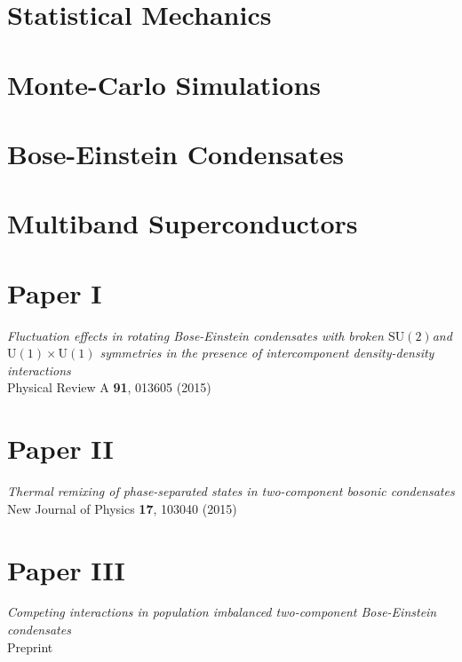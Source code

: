 \documentclass[11pt,b5paper,onecolumn,titlepage,openright,twoside,final]{book}
\begin{document}
\chapter{Statistical Mechanics}
\label{ch:statmech}

\chapter{Monte-Carlo Simulations}
\label{ch:MC}

\chapter{Bose-Einstein Condensates}
\label{ch:BEC}

\chapter{Multiband Superconductors}
\label{ch:MBSC}



\clearpage
\pagestyle{empty}
\ChTitleVar{\centering\Large\bfseries}
\chapter*{Paper I}
\centering \textit{Fluctuation effects in rotating Bose-Einstein condensates with broken
$\mathrm{SU}(2)$and $\mathrm{U}(1)\times\mathrm{U}(1)$ symmetries in the presence of intercomponent
density-density interactions}\\
\bigskip
\centering Physical Review A {\bf 91}, 013605 (2015)
\cleardoublepage

\chapter*{Paper II}
\centering \textit{Thermal remixing of phase-separated states in two-component bosonic condensates}\\
\bigskip
\centering New Journal of Physics {\bf 17}, 103040 (2015)
\cleardoublepage

% 
\chapter*{Paper III}
\centering \textit{Competing interactions in population imbalanced two-component Bose-Einstein
condensates}\\
\bigskip
\centering Preprint
\cleardoublepage

\end{document}
